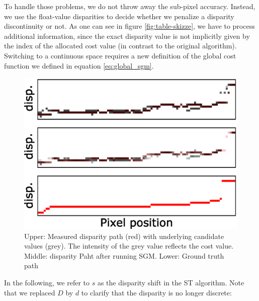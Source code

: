 \documentclass  [
  paper    = a4,
  BCOR     = 10mm,
  twoside,
  fontsize = 12pt,
  fleqn,
  toc      = bibnumbered,
  toc      = listofnumbered,
  numbers  = noendperiod,
  headings = normal,
  listof   = leveldown,
  version  = 3.03
]                                       {scrreprt}
\begin{document}
To handle those problems, we do not throw away the sub-pixel accuracy. Instead, we use the float-value disparities to decide whether we penalize a disparity discontinuity or not. As one can see in figure \ref{fig:table-skizze}, we have to process additional information, since the exact disparity value is not implicitly given by the index of the allocated cost value (in contrast to the original algorithm). Switching to a continuous space requires a new definition of the global cost function we defined in equation \ref{eq:global_sgm}.

\begin{figure}[h!]
	\centering
	\includegraphics[width=0.6\linewidth]{images/pens_paths}
	\caption[Exemplary SGM path]{Upper: Measured disparity path (red) with underlying candidate values (grey). The intensity of the grey value reflects the cost value. Middle: disparity Paht after running SGM. Lower: Ground truth path}
	\label{fig:penspaths}
\end{figure}



 In the following, we refer to $s$ as the disparity shift in the ST algorithm. Note that we replaced $D$ by $d$ to clarify that the disparity is no longer discrete:
\end{document}
